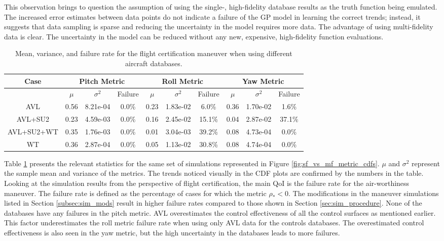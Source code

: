 This observation brings to question the assumption of using the single-, high-fidelity database results as the truth function being emulated. 
The increased error estimates between data points do not indicate a failure of the GP model in learning the correct trends; instead, it suggests that data sampling is sparse and reducing the uncertainty in the model requires more data.
The advantage of using multi-fidelity data is clear. 
The uncertainty in the model can be reduced without any new, expensive, high-fidelity function evaluations.

\begin{table}
\centering
    \renewcommand{\arraystretch}{1.2}
    \captionsetup{justification=centering}
    \caption{Mean, variance, and failure rate for the flight certification maneuver when using different aircraft databases.} 
    \begin{tabular}{|c|c|c|c|c|c|c|c|c|c|}
    \hline
        Case & \multicolumn{3}{c|}{Pitch Metric} & \multicolumn{3}{c|}{Roll Metric} & \multicolumn{3}{c|}{Yaw Metric} \\ \hline
         & $\mu$ & $\sigma^2$ & Failure & $\mu$ & $\sigma^2$ & Failure & $\mu$ & $\sigma^2$ & Failure \\ \hline
        AVL & 0.56 & 8.21e-04 & 0.0\% & 0.23 & 1.83e-02 & 6.0\% & 0.36 & 1.70e-02 & 1.6\% \\ \hline
        AVL+SU2 & 0.23 & 4.59e-03 & 0.0\% & 0.16 & 2.45e-02 & 15.1\% & 0.04 & 2.87e-02 & 37.1\% \\ \hline
        AVL+SU2+WT & 0.35 & 1.76e-03 & 0.0\% & 0.01 & 3.04e-03 & 39.2\% & 0.08 & 4.73e-04 & 0.0\% \\ \hline
        WT & 0.36 & 2.87e-04 & 0.0\% & 0.05 & 1.13e-02 & 30.8\% & 0.08 & 4.74e-04 & 0.0\% \\ \hline
    \end{tabular}
    \label{tab:sf_vs_mf_perf_stats}
\end{table}

Table \ref{tab:sf_vs_mf_perf_stats} presents the relevant statistics for the same set of simulations represented in Figure \ref{fig:sf_vs_mf_metric_cdfs}.
$\mu$ and $\sigma^2$ represent the sample mean and variance of the metrics.
The trends noticed visually in the CDF plots are confirmed by the numbers in the table. 
Looking at the simulation results from the perspective of flight certification, the main QoI is the failure rate for the air-worthiness maneuver. 
The failure rate is defined as the percentage of cases for which the metric $\rho_* < 0$.
The modifications in the maneuver simulations listed in Section \ref{subsec:sim_mods} result in higher failure rates compared to those shown in Section \ref{sec:sim_procedure}.
None of the databases have any failures in the pitch metric. 
AVL overestimates the control effectiveness of all the control surfaces as mentioned earlier.
This factor underestimates the roll metric failure rate when using only AVL data for the controls databases. 
The overestimated control effectiveness is also seen in the yaw metric, but the high uncertainty in the databases leads to more failures. 

